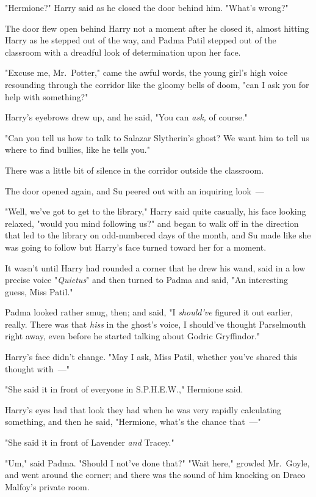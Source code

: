 "Hermione?" Harry said as he closed the door behind him. "What's wrong?"

The door flew open behind Harry not a moment after he closed it, almost hitting
Harry as he stepped out of the way, and Padma Patil stepped out of the
classroom with a dreadful look of determination upon her face.

"Excuse me, Mr.~Potter," came the awful words, the young girl's high voice
resounding through the corridor like the gloomy bells of doom, "can I ask you
for help with something?"

Harry's eyebrows drew up, and he said, "You can \emph{ask,} of course."

"Can you tell us how to talk to Salazar Slytherin's ghost? We want him to tell
us where to find bullies, like he tells you."

There was a little bit of silence in the corridor outside the classroom.

The door opened again, and Su peered out with an inquiring look~---

"Well, we've got to get to the library," Harry said quite casually, his face
looking relaxed, "would you mind following us?" and began to walk off in the
direction that led to the library on odd-numbered days of the month, and Su
made like she was going to follow but Harry's face turned toward her for a
moment.

It wasn't until Harry had rounded a corner that he drew his wand, said in a low
precise voice "\emph{Quietus}" and then turned to Padma and said, "An
interesting guess, Miss Patil."

Padma looked rather smug, then; and said, "I \emph{should've} figured it out
earlier, really. There was that \emph{hiss} in the ghost's voice, I should've
thought Parselmouth right away, even before he started talking about Godric
Gryffindor."

Harry's face didn't change. "May I ask, Miss Patil, whether you've shared this
thought with~---"

"She said it in front of everyone in S.P.H.E.W.," Hermione said.

Harry's eyes had that look they had when he was very rapidly calculating
something, and then he said, "Hermione, what's the chance that~---"

"She said it in front of Lavender \emph{and} Tracey."

"Um," said Padma. "Should I not've done that?"
\sbreak
"Wait here," growled Mr.~Goyle, and went around the corner; and there was the
sound of him knocking on Draco Malfoy's private room.


